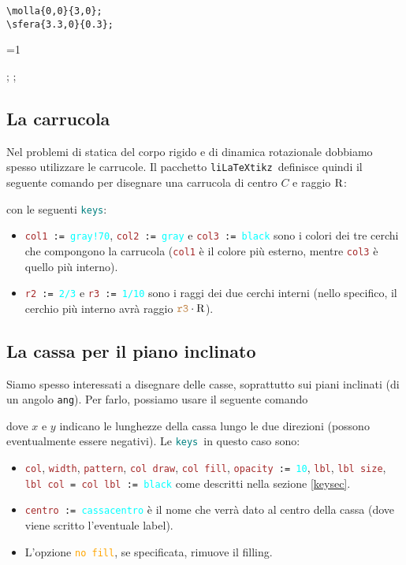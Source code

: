 \documentclass[italian, a4paper]{article}
\def\showimmagini{1} %
\newcommand{\bs}{\textbackslash}
\newcommand{\ttt}[1]{\texttt{#1}}
\newcommand{\liLaTeXtikz}{\ttt{liLaTeXtikz}}
\newcommand{\comandons}[2][\large]{\vspace*{1mm}\noindent\fbox{\parbox{\textwidth}{#1\ttt{#2}}}}
\newcommand{\blue}[1]{\textcolor{blue}{#1}}
\newcommand{\cyan}[1]{\textcolor{cyan}{#1}}
\newcommand{\keys}{\textcolor{teal}{\ttt{keys}}}
\newcommand{\key}[1]{\textcolor{brown}{\ttt{#1}}}
\newcommand{\keyop}[1]{\textcolor{orange}{\ttt{#1}}}
\newcommand{\keyval}[1]{\cyan{\ttt{#1}}}
\begin{document}
\begin{Verbatim}[frame=single]
\molla{0,0}{3,0};
\sfera{3.3,0}{0.3};
\end{Verbatim}
\vspace*{-4mm}

\ifnum\showimmagini=1
\begin{immagine}
;
;
\end{immagine}
\fi

\subsection{La carrucola}
Nel problemi di statica del corpo rigido e di dinamica rotazionale dobbiamo spesso utilizzare le carrucole. Il pacchetto \liLaTeXtikz\ definisce quindi il seguente comando per disegnare una carrucola di centro $C$ e raggio $\rR$:

\comandons{\bs carrucola[\keys]\{\blue{$C$}\}\{\blue{$\rR$}\};}
con le seguenti \keys:
\begin{itemize}[nolistsep]
\item \ttt{\key{col1} := \keyval{gray!70}}, \ttt{\key{col2} := \keyval{gray}} e \ttt{\key{col3} := \keyval{black}} sono i colori dei tre cerchi che compongono la carrucola (\key{col1} è il colore più esterno, mentre \key{col3} è quello più interno).
\item \ttt{\key{r2} := \keyval{2/3}} e \ttt{\key{r3} := \keyval{1/10}} sono i raggi dei due cerchi interni (nello specifico, il cerchio più interno avrà raggio $\key{r3}\cdot\rR$).
\end{itemize}

\subsection{La cassa per il piano inclinato}
Siamo spesso interessati a disegnare delle casse, soprattutto sui piani inclinati (di un angolo \ttt{ang}). Per farlo, possiamo usare il seguente comando

\comandons{\bs cassa[\keys]\{\blue{punto iniziale}\}\{\blue{$x$}\}\{\blue{$y$}\}\{\blue{ang}\};}
dove $x$ e $y$ indicano le lunghezze della cassa lungo le due direzioni (possono eventualmente essere negativi). Le \keys\ in questo caso sono:
\begin{itemize}[nolistsep]
\item \key{col}, \key{width}, \key{pattern}, \key{col draw}, \key{col fill}, \ttt{\key{opacity} := \keyval{10}}, \key{lbl}, \key{lbl size}, \ttt{\key{lbl col} = \key{col lbl} := \keyval{black}} come descritti nella sezione \ref{keysec}.
\item \ttt{\key{centro} := \keyval{cassacentro}} è il nome che verrà dato al centro della cassa (dove viene scritto l'eventuale label).
\item L'opzione \keyop{no fill}, se specificata, rimuove il filling.
\end{itemize}
\end{document}
